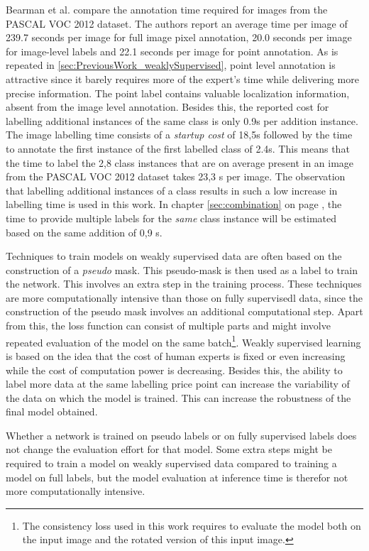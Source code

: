 \par{
    Bearman et al.\cite{Bearman2015} compare the annotation time required for images from the PASCAL VOC 2012 dataset.
    The authors report an average time per image of 239.7 seconds per image for full image pixel annotation, 20.0 seconds per image for image-level labels and 22.1 seconds per image for point annotation.
    As is repeated in \ref{sec:PreviousWork_weaklySupervised}, point level annotation is attractive since it barely requires more of the expert's time while delivering more precise information.
    The point label contains valuable localization information, absent from the image level annotation.
    Besides this, the reported cost for labelling additional instances of the same class is only 0.9s per addition instance.
    The image labelling time consists of a \textit{startup cost} of 18,5s followed by the time to annotate the first instance of the first labelled class of 2.4s.
    This means that the time to label the 2,8 class instances that are on average present in an image from the PASCAL VOC 2012 dataset takes 23,3 s per image.
    The observation that labelling additional instances of a class results in such a low increase in labelling time is used in this work.
    In chapter \ref{sec:combination} on page \pageref{sec:combination}, the time to provide multiple labels for the \textit{same} class instance will be estimated based on the same addition of 0,9 s.
}
\\[5pt]
\par{
    Techniques to train models on weakly supervised data are often based on the construction of a \textit{pseudo} mask.
    This pseudo-mask is then used as a label to train the network.
    This involves an extra step in the training process.
    These techniques are more computationally intensive than those on fully \Gls{supervisedl} data, since the construction of the pseudo mask involves an additional computational step.
    Apart from this, the loss function can consist of multiple parts and might involve repeated evaluation of the model on the same batch\footnote{
        The consistency loss used in this work requires to evaluate the model both on the input image and the rotated version of this input image.
        }. 
    Weakly supervised learning is based on the idea that the cost of human experts is fixed or even increasing while the cost of computation power is decreasing.
    Besides this, the ability to label more data at the same labelling price point can increase the variability of the data on which the model is trained. 
    This can increase the robustness of the final model obtained.
}
\par{
    Whether a network is trained on pseudo labels or on fully supervised labels does not change the evaluation effort for that model.
    Some extra steps might be required to train a model on weakly supervised data compared to training a model on full labels, 
    but the model evaluation at inference time is therefor not more computationally intensive.
}